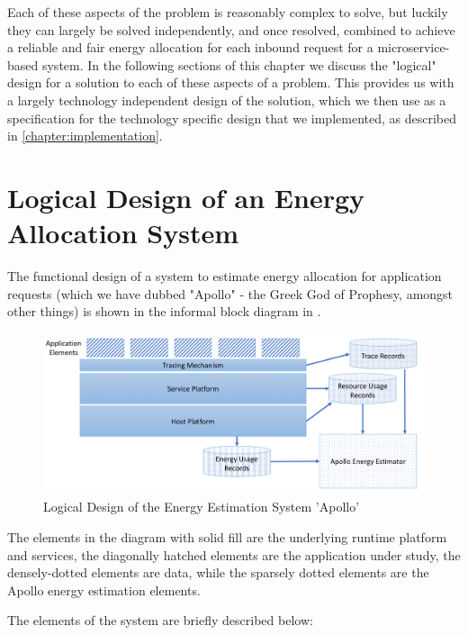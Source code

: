 Each of these aspects of the problem is reasonably complex to solve, but luckily they can largely be solved independently, and once resolved, combined to achieve a reliable and fair energy allocation for each inbound request for a microservice-based system.  In the following sections of this chapter we discuss the "logical" design for a solution to each of these aspects of a problem.  This provides us with a largely technology independent design of the solution, which we then use as a specification for the technology specific design that we implemented, as described in \cref{chapter:implementation}.

\section{Logical Design of an Energy Allocation System}

The functional design of a system to estimate energy allocation for application requests (which we have dubbed "Apollo" - the Greek God of Prophesy, amongst other things) is shown in the informal block diagram in .

\begin{figure}
\centering
\includegraphics[width=\textwidth]{Figures/estimating-energy-logical}
\caption{Logical Design of the Energy Estimation System 'Apollo'}
\label{figure:logicaldesign}
\end{figure}

The elements in the diagram with solid fill are the underlying runtime platform and services, the diagonally hatched elements are the application under study, the densely-dotted elements are data, while the sparsely dotted elements are the Apollo energy estimation elements.

The elements of the system are briefly described below:

